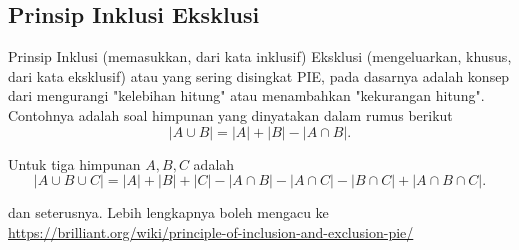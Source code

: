 \subsection{Prinsip Inklusi Eksklusi}
Prinsip Inklusi (memasukkan, dari kata inklusif) Eksklusi (mengeluarkan, khusus, dari kata eksklusif) atau yang sering disingkat PIE, pada dasarnya adalah konsep dari mengurangi "kelebihan hitung" atau menambahkan "kekurangan hitung". Contohnya adalah soal himpunan yang dinyatakan dalam rumus berikut
$$|A \cup B|=|A|+|B|-|A \cap B|.$$

Untuk tiga himpunan $A,B,C$ adalah
$$|A \cup B \cup C|=|A|+|B|+|C|-|A \cap B|-|A \cap C|-|B \cap C|+|A \cap B \cap C|.$$

dan seterusnya. Lebih lengkapnya boleh mengacu ke \href{https://brilliant.org/wiki/principle-of-inclusion-and-exclusion-pie/}{https://brilliant.org/wiki/principle-of-inclusion-and-exclusion-pie/}

